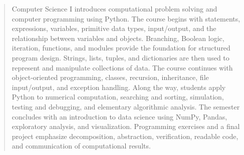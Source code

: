 \documentclass[10pt]{article}
\begin{document}
\maketitle

\begin{abstract}
Computer Science I introduces computational problem solving and computer programming using Python. The course begins with statements, expressions, variables, primitive data types, input/output, and the relationship between variables and objects. Branching, Boolean logic, iteration, functions, and modules provide the foundation for structured program design. Strings, lists, tuples, and dictionaries are then used to represent and manipulate collections of data. The course continues with object-oriented programming, classes, recursion, inheritance, file input/output, and exception handling. Along the way, students apply Python to numerical computation, searching and sorting, simulation, testing and debugging, and elementary algorithmic analysis. The semester concludes with an introduction to data science using NumPy, Pandas, exploratory analysis, and visualization. Programming exercises and a final project emphasize decomposition, abstraction, verification, readable code, and communication of computational results.
\end{abstract}
\end{document}

